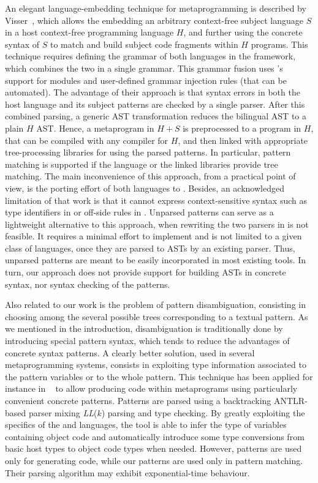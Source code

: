 An elegant language\hyp{}embedding technique for meta\-programming is
described by Visser~\cite{metaprog}, which allows the embedding an
arbitrary context\hyp{}free subject language \(S\) in a host
context\hyp{}free programming language \(H\), and further using the
concrete syntax of \(S\) to match and build subject code fragments
within \(H\) programs. This technique requires defining the grammar of
both languages in the \SDF framework, which combines the two in a
single grammar. This grammar fusion uses \SDF's support for modules
and user\hyp{}defined grammar injection rules (that can be
automated). The advantage of their approach is that syntax errors in
both the host language and its subject patterns are checked by a
single parser. After this combined parsing, a generic AST
transformation reduces the bilingual AST to a plain \(H\) AST. Hence,
a meta\-program in \(H+S\) is preprocessed to a program in \(H\), that
can be compiled with any compiler for \(H\), and then linked with
appropriate tree\hyp{}processing libraries for using the parsed
patterns. In particular, pattern matching is supported if the language
or the linked libraries provide tree matching. The main inconvenience
of this approach, from a practical point of view, is the porting
effort of both languages to \SDF. Besides, an acknowledged limitation
of that work is that it cannot express context\hyp{}sensitive syntax
such as type identifiers in \Clang or off\hyp{}side rules in
\Haskell. Unparsed patterns can serve as a lightweight alternative to
this approach, when re\-writing the two parsers in \SDF is not
feasible. It requires a minimal effort to implement and is not limited
to a given class of languages, once they are parsed to ASTs by an
existing parser. Thus, unparsed patterns are meant to be easily
incorporated in most existing tools. In turn, our approach does not
provide support for building ASTs in concrete syntax, nor syntax
checking of the patterns.

Also related to our work is the problem of pattern disambiguation,
consisting in choosing among the several possible trees corresponding
to a textual pattern. As we mentioned in the introduction,
disambiguation is traditionally done by introducing special pattern
syntax, which tends to reduce the advantages of concrete syntax
patterns. A clearly better solution, used in several meta\-programming
systems, consists in exploiting type information associated to the
pattern variables or to the whole pattern. This technique has been
applied for instance in \MetaAspectJ~\cite{maj} to allow producing
\AspectJ code within \Java meta\-programs using particularly
convenient concrete patterns. Patterns are parsed using a backtracking
\textsf{ANTLR}\hyp{}based parser mixing \textit{LL}(\(k\)) parsing and
type checking. By greatly exploiting the specifics of the \Java and
\AspectJ languages, the tool is able to infer the type of variables
containing object code and automatically introduce some type
conversions from basic host types to object code types when
needed. However, patterns are used only for generating code, while our
patterns are used only in pattern matching. Their parsing algorithm
may exhibit exponential\hyp{}time behaviour.

